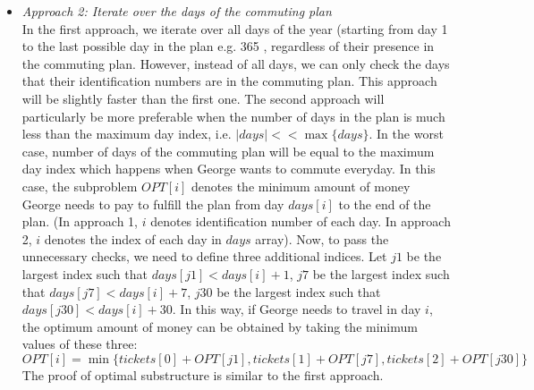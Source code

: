 \documentclass{article}
\begin{document}
\begin{itemize}

\item\textit{Approach 2: Iterate over the days of the commuting plan}\\
In the first approach, we iterate over all days of the year (starting from day 1 to the last possible day in the plan e.g. 365 , regardless of their presence in the commuting plan. 
However, instead of all days, we can only check the days that their identification numbers are in the commuting plan. This approach will be slightly faster than the first one. The second approach will particularly be more preferable when the number of days in the plan is much less than the maximum day index, i.e. $|days| << \max\{days\}$. In the worst case, number of days of the commuting plan will be equal to the maximum day index which happens when George wants to commute everyday.
In this case, the subproblem $OPT[i]$ denotes the minimum amount of money George needs to pay to fulfill the plan from day $days[i]$ to the end of the plan. (In approach 1, $i$ denotes identification number of each day. In approach 2, $i$ denotes the index of each day in $days$ array). Now, to pass the unnecessary checks, we need to define three additional indices. Let $j1$ be the largest index such that 
$days[j1] < days[i] + 1$, $j7$ be the largest index such that 
$days[j7] < days[i] + 7$, $j30$ be the largest index such that   
$days[j30] < days[i] + 30$. In this way, if George needs to travel in day $i$, the optimum amount of money can be obtained by taking the minimum values of these three:
$$
OPT[i] = \min\{ tickets[0] + OPT[j1], tickets[1] + OPT[j7] ,  tickets[2] + OPT[j30]\}
$$
The proof of optimal substructure is similar to the first approach.
\end{itemize}
\end{document}
